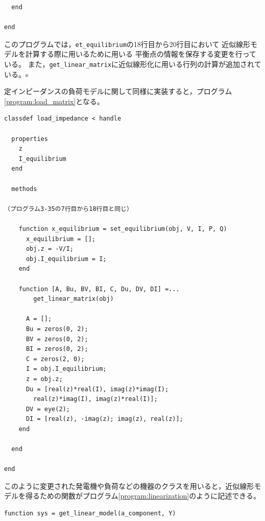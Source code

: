 \documentclass[tombow,dvipdfmx]{corona-a5-1.1}
\begin{document}
\begin{例}[近似線形モデルの実装]
\begin{PROGRAMA}[count,title={generator.m}]
\begin{verbatim}
  end

end
\end{verbatim}
\end{PROGRAMA}


このプログラムでは，\verb|et_equilibrium|の18行目から20行目において
近似線形モデルを計算する際に用いるために用いる
平衡点の情報を保存する変更を行っている。
また，\verb|get_linear_matrix|に近似線形化に用いる行列の計算が追加されている。s


定インピーダンスの負荷モデルに関して同様に実装すると，プログラム\ref{program:load_matrix}となる。

\smallskip
\begin{PROGRAMA}[count,title={load\_impedance.m}]\label{program:load_matrix}
\begin{verbatim}
classdef load_impedance < handle
  
  properties
    z
    I_equilibrium
  end
  
  methods

（プログラム3-35の7行目から18行目と同じ）
   
    function x_equilibrium = set_equilibrium(obj, V, I, P, Q)
      x_equilibrium = [];
      obj.z = -V/I;
      obj.I_equilibrium = I;
    end
    
    function [A, Bu, BV, BI, C, Du, DV, DI] =...
        get_linear_matrix(obj)
      
      A = [];
      Bu = zeros(0, 2);
      BV = zeros(0, 2);
      BI = zeros(0, 2);
      C = zeros(2, 0);
      I = obj.I_equilibrium;
      z = obj.z;
      Du = [real(z)*real(I), imag(z)*imag(I);
        real(z)*imag(I), imag(z)*real(I)];
      DV = eye(2);
      DI = [real(z), -imag(z); imag(z), real(z)];
    end
    
  end
  
end
\end{verbatim}
\end{PROGRAMA}

このように変更された発電機や負荷などの機器のクラスを用いると，近似線形モデルを得るための関数がプログラム\ref{program:linearization}のように記述できる。

\smallskip
\begin{PROGRAMA}[count,title={get\_linear\_model.m}]\label{program:linearization}
\begin{verbatim}
function sys = get_linear_model(a_component, Y)


\end{verbatim}
\end{PROGRAMA}
\end{例}
\end{document}

